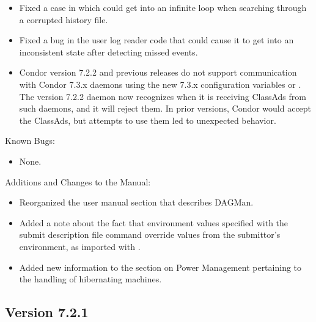 \begin{itemize}
\item Fixed a case in which  could get into an infinite
loop when searching through a corrupted history file.

\item Fixed a bug in the user log reader code that could cause it to
  get into an inconsistent state after detecting missed events.

\item Condor version 7.2.2 and previous releases do not support 
  communication with Condor 7.3.x daemons using the new 7.3.x
  configuration variables  or
  .
  The version 7.2.2  daemon now
  recognizes when it is receiving ClassAds from such daemons,
  and it will reject them.
  In prior versions, Condor would accept the ClassAds,
  but attempts to use them led to unexpected behavior.

\end{itemize}

\noindent Known Bugs:

\begin{itemize}

\item None.

\end{itemize}

\noindent Additions and Changes to the Manual:

\begin{itemize}

\item Reorganized the user manual section that describes DAGMan.

\item Added a note about the fact that environment values specified
with the  submit description file command override values from
the submittor's environment, as imported with .

\item Added new information to the section on Power Management
  pertaining to the handling of hibernating machines.
  

\end{itemize}


\subsection*{\label{sec:New-7-2-1}Version 7.2.1}


